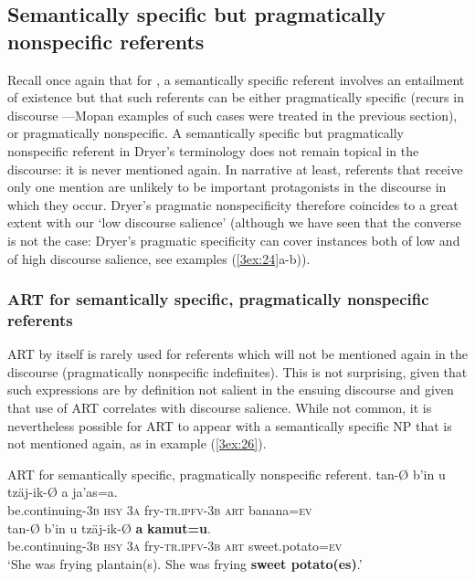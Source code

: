 \documentclass[output=paper]{langsci/langscibook}
\begin{document}
\subsection{Semantically specific but pragmatically nonspecific referents}\label{3sec:34}

Recall once again that for \cite{dryer:14}, a semantically specific referent involves an entailment of existence but that such referents can be either pragmatically specific (recurs in discourse ---Mopan examples of such cases were treated in the previous section), or pragmatically nonspecific. A semantically specific but pragmatically nonspecific referent in Dryer's terminology does not remain topical in the discourse: it is never mentioned again. In narrative at least, referents that receive only one mention are unlikely to be important protagonists in the discourse in which they occur. Dryer's pragmatic nonspecificity therefore coincides to a great extent with our `low discourse salience' (although we have seen that the converse is not the case: Dryer's pragmatic specificity can cover instances both of low and of high discourse salience, see examples (\ref{3ex:24}a-b)).

\subsubsection{ART for semantically specific, pragmatically nonspecific referents}\label{3sec:341}

ART by itself is rarely used for referents which will not be mentioned again in the discourse (pragmatically nonspecific indefinites).  This is not surprising, given that such expressions are by definition not salient in the ensuing discourse and given that use of ART correlates with discourse salience.  While not common, it is nevertheless possible for ART to appear with a semantically specific NP that is not mentioned again, as in example (\ref{3ex:26}).

\begin{exe}
\ex\label{3ex:26}
ART for semantically specific, pragmatically nonspecific referent. 
\exi{}
\gll	tan-{\O}				b'in		u		tz\"aj-ik-{\O}		a	ja'as=a. \\
	be.continuing-{\textsc{3b}}	{\textsc{hsy}}	{\textsc{3a}}	fry-{\textsc{tr.ipfv-3b}}	{\textsc{art}}	banana={\textsc{ev}} \\
\glt
\exi{}
\gll	tan-{\O}				b'in		u		tz\"aj-ik-{\O}		{\textbf{a}}	{\textbf{kamut=u}}. \\
	be.continuing-{\textsc{3b}}	{\textsc{hsy}}	{\textsc{3a}}	fry-{\textsc{tr.ipfv-3b}}	{\textsc{art}}		sweet.potato={\textsc{ev}} \\
\glt	`She was frying plantain(s).  She was frying {\textbf{sweet potato(es)}}.'
\end{exe}
\end{document}
